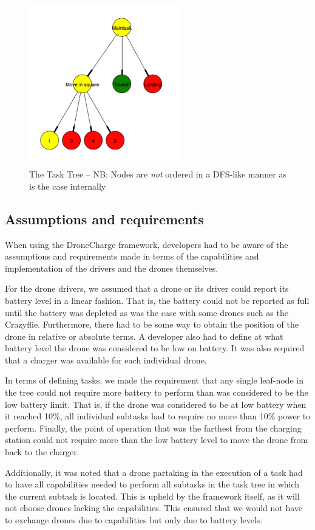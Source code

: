 \begin{figure}[h]
\begin{center}
\includegraphics[height=7cm]{images/task-graph.png}%
\caption{The Task Tree -- NB: Nodes are \textit{not} ordered in a DFS-like manner as is the case internally}
\label{fig:tasktree}
\end{center}
\end{figure}

\subsection{Assumptions and requirements}
When using the DroneCharge framework, developers had to be aware of the assumptions and requirements made in terms of the capabilities and implementation of the drivers and the drones themselves.

For the drone drivers, we assumed that a drone or its driver could report its battery level in a linear fashion. That is, the battery could not be reported as full until the battery was depleted as was the case with some drones such as the Crazyflie. Furthermore, there had to be some way to obtain the position of the drone in relative or absolute terms. A developer also had to define at what battery level the drone was considered to be low on battery. It was also required that a charger was available for each individual drone.

In terms of defining tasks, we made the requirement that any single leaf-node in the tree could not require more battery to perform than was considered to be the low battery limit. That is, if the drone was considered to be at low battery when it reached 10\%, all individual subtasks had to require no more than 10\% power to perform. Finally, the point of operation that was the farthest from the charging station could not require more than the low battery level to move the drone from back to the charger.

Additionally, it was noted that a drone partaking in the execution of a task had to have all capabilities  needed to perform all subtasks in the task tree in which the current subtask is located. This is upheld by the framework itself, as it will not choose drones lacking the capabilities. This ensured that we would not have to exchange drones due to capabilities but only due to battery levels.
